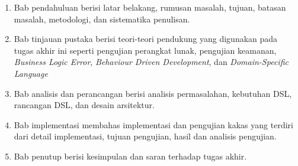 \begin{enumerate}
      \item Bab pendahuluan berisi latar belakang, rumusan masalah, tujuan, batasan masalah, metodologi, dan sistematika penulisan.

      \item Bab tinjauan pustaka berisi teori-teori pendukung yang digunakan pada tugas akhir ini seperti pengujian perangkat lunak,
            pengujian keamanan, \textit{Business Logic Error}, \textit{Behaviour Driven Development}, dan \textit{Domain-Specific Language}

      \item Bab analisis dan perancangan berisi analisis permasalahan, kebutuhan DSL, rancangan DSL, dan desain arsitektur.

      \item Bab implementasi membahas implementasi dan pengujian kakas yang terdiri dari detail implementasi, tujuan pengujian, hasil dan analisis pengujian.

      \item Bab penutup berisi kesimpulan dan saran terhadap tugas akhir.
\end{enumerate}